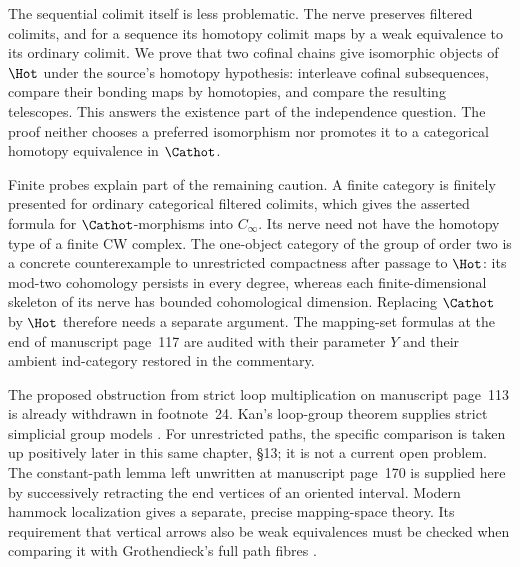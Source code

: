 The sequential colimit itself is less problematic.  The nerve preserves filtered colimits, and for a sequence its homotopy colimit maps by a weak equivalence to its ordinary colimit.  We prove that two cofinal chains give isomorphic objects of $\Hot$ under the source's homotopy hypothesis: interleave cofinal subsequences, compare their bonding maps by homotopies, and compare the resulting telescopes.  This answers the existence part of the independence question.  The proof neither chooses a preferred isomorphism nor promotes it to a categorical homotopy equivalence in $\Cathot$.

Finite probes explain part of the remaining caution.  A finite category is finitely presented for ordinary categorical filtered colimits, which gives the asserted formula for $\Cathot$-morphisms into $C_\infty$.  Its nerve need not have the homotopy type of a finite CW complex.  The one-object category of the group of order two is a concrete counterexample to unrestricted compactness after passage to $\Hot$: its mod-two cohomology persists in every degree, whereas each finite-dimensional skeleton of its nerve has bounded cohomological dimension.  Replacing $\Cathot$ by $\Hot$ therefore needs a separate argument.  The mapping-set formulas at the end of manuscript page~117 are audited with their parameter $Y$ and their ambient ind-category restored in the commentary.

The proposed obstruction from strict loop multiplication on manuscript page~113 is already withdrawn in footnote~24.  Kan's loop-group theorem supplies strict simplicial group models \citep[Theorem~7.1]{Kan1958Combinatorial}.  For unrestricted paths, the specific comparison is taken up positively later in this same chapter, \S13; it is not a current open problem.  The constant-path lemma left unwritten at manuscript page~170 is supplied here by successively retracting the end vertices of an oriented interval.  Modern hammock localization gives a separate, precise mapping-space theory.  Its requirement that vertical arrows also be weak equivalences must be checked when comparing it with Grothendieck's full path fibres \citep{DwyerKan1980Calculating,ArakawaCnossen2026}.
\nocite{*}
